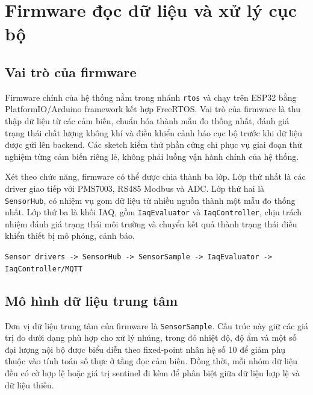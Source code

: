\section{Firmware đọc dữ liệu và xử lý cục bộ}

\subsection{Vai trò của firmware}

Firmware chính của hệ thống nằm trong nhánh \texttt{rtos} và chạy trên ESP32 bằng
PlatformIO/Arduino framework kết hợp FreeRTOS. Vai trò của firmware là thu thập dữ liệu
từ các cảm biến, chuẩn hóa thành mẫu đo thống nhất, đánh giá trạng thái chất lượng không
khí và điều khiển cảnh báo cục bộ trước khi dữ liệu được gửi lên backend. Các sketch
kiểm thử phần cứng chỉ phục vụ giai đoạn thử nghiệm từng cảm biến riêng lẻ, không phải
luồng vận hành chính của hệ thống.

Xét theo chức năng, firmware có thể được chia thành ba lớp. Lớp thứ nhất là các driver
giao tiếp với PMS7003, RS485 Modbus và ADC. Lớp thứ hai là \texttt{SensorHub}, có nhiệm
vụ gom dữ liệu từ nhiều nguồn thành một mẫu đo thống nhất. Lớp thứ ba là khối IAQ, gồm
\texttt{IaqEvaluator} và \texttt{IaqController}, chịu trách nhiệm đánh giá trạng thái môi
trường và chuyển kết quả thành trạng thái điều khiển thiết bị mô phỏng, cảnh báo.

\begin{center}
\texttt{Sensor drivers -> SensorHub -> SensorSample -> IaqEvaluator -> IaqController/MQTT}
\end{center}

\subsection{Mô hình dữ liệu trung tâm}

Đơn vị dữ liệu trung tâm của firmware là \texttt{SensorSample}. Cấu trúc này giữ các giá
trị đo dưới dạng phù hợp cho xử lý nhúng, trong đó nhiệt độ, độ ẩm và một số đại lượng
nội bộ được biểu diễn theo fixed-point nhân hệ số 10 để giảm phụ thuộc vào tính toán số
thực ở tầng đọc cảm biến. Đồng thời, mỗi nhóm dữ liệu đều có cờ hợp lệ hoặc giá trị
sentinel đi kèm để phân biệt giữa dữ liệu hợp lệ và dữ liệu thiếu.

